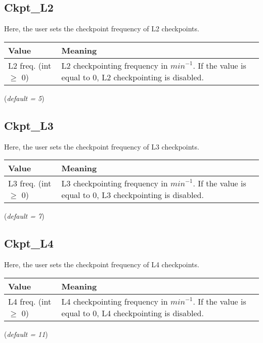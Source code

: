 \documentclass{refrep}
\begin{document}
\subsection{Ckpt\_L2}\label{subsec:ckptl2}
Here, the user sets the checkpoint frequency of L2 checkpoints.
\begin{center}
\begin{tabular}[h!]{|p{}|p{}|}
\hline
\textbf{Value} & \textbf{Meaning} \\ \hline
L2 freq. (int $\geq$ 0)  & L2 checkpointing frequency in $\textit{min}^{-1}$. If the value is equal to 0, L2 checkpointing is disabled.  \\ \hline
\end{tabular}
\end{center}
(\textit{default = 5})
\subsection{Ckpt\_L3}\label{subsec:ckptl3}
Here, the user sets the checkpoint frequency of L3 checkpoints.
\begin{center}
\begin{tabular}[h!]{|p{}|p{}|}
\hline
\textbf{Value} & \textbf{Meaning} \\ \hline
L3 freq. (int $\geq$ 0)  & L3 checkpointing frequency in $\textit{min}^{-1}$. If the value is equal to 0, L3 checkpointing is disabled.  \\ \hline
\end{tabular}
\end{center}
(\textit{default = 7})
\subsection{Ckpt\_L4}\label{subsec:ckptl4}
Here, the user sets the checkpoint frequency of L4 checkpoints.
\begin{center}
\begin{tabular}[h!]{|p{}|p{}|}
\hline
\textbf{Value} & \textbf{Meaning} \\ \hline
L4 freq. (int $\geq$ 0)  & L4 checkpointing frequency in $\textit{min}^{-1}$. If the value is equal to 0, L4 checkpointing is disabled.  \\ \hline
\end{tabular}
\end{center}
(\textit{default = 11})
\end{document}
